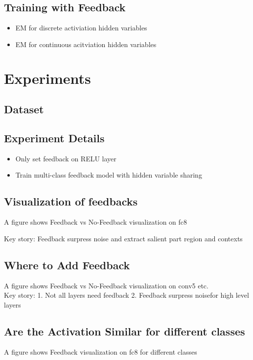 \documentclass[10pt,twocolumn,letterpaper]{article}
\begin{document}
\subsection{Training with Feedback}
\begin{itemize}
  \item EM for discrete activiation hidden variables
  \item EM for continuous acitviation hidden variables
\end{itemize}

\section{Experiments}

\subsection{Dataset}

\subsection{Experiment Details}
\begin{itemize}
  \item Only set feedback on RELU layer
  \item Train multi-class feedback model with hidden variable sharing
\end{itemize}

\subsection{Visualization of feedbacks}
A figure shows Feedback vs No-Feedback visualization on fc8

Key story: Feedback surpress noise and extract salient part region and contexts

\subsection{Where to Add Feedback}
A figure shows Feedback vs No-Feedback visualization on conv5 etc. \\

Key story: 1. Not all layers need feedback 2. Feedback surpress noisefor high level layers

\subsection{Are the Activation Similar for different classes}
A figure shows Feedback visualization on fc8 for different classes \\
\end{document}
